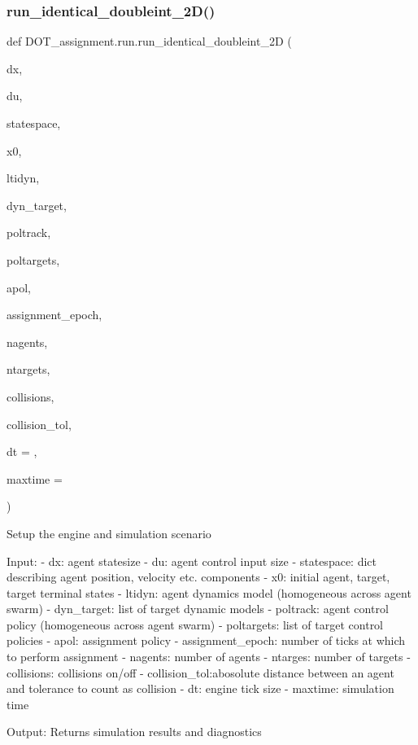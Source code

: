 \subsubsection{\texorpdfstring{run\_identical\_doubleint\_2D()}{run\_identical\_doubleint\_2D()}}
{\footnotesize\ttfamily def D\+O\+T\+\_\+assignment.\+run.\+run\+\_\+identical\+\_\+doubleint\+\_\+2D (\begin{DoxyParamCaption}\item[{}]{dx,  }\item[{}]{du,  }\item[{}]{statespace,  }\item[{}]{x0,  }\item[{}]{ltidyn,  }\item[{}]{dyn\+\_\+target,  }\item[{}]{poltrack,  }\item[{}]{poltargets,  }\item[{}]{apol,  }\item[{}]{assignment\+\_\+epoch,  }\item[{}]{nagents,  }\item[{}]{ntargets,  }\item[{}]{collisions,  }\item[{}]{collision\+\_\+tol,  }\item[{}]{dt = {},  }\item[{}]{maxtime = {} }\end{DoxyParamCaption})}

\begin{DoxyVerb}Setup the engine and simulation scenario

Input:
    - dx:           agent statesize
    - du:           agent control input size
    - statespace:   dict describing agent position, velocity etc. components
    - x0:           initial agent, target, target terminal states
    - ltidyn:       agent dynamics model (homogeneous across agent swarm)
    - dyn_target:   list of target dynamic models
    - poltrack:     agent control policy (homogeneous across agent swarm)
    - poltargets:   list of target control policies
    - apol:         assignment policy
    - assignment_epoch: number of ticks at which to perform assignment
    - nagents:      number of agents
    - ntarges:      number of targets
    - collisions:   collisions on/off
    - collision_tol:abosolute distance between an agent and tolerance to count as collision
    - dt:           engine tick size
    - maxtime:      simulation time

Output: Returns simulation results and diagnostics\end{DoxyVerb}
 \mbox{\label{namespace_d_o_t__assignment_1_1run_a434c7b44eb065ea4df4e503d0080a442}} 
